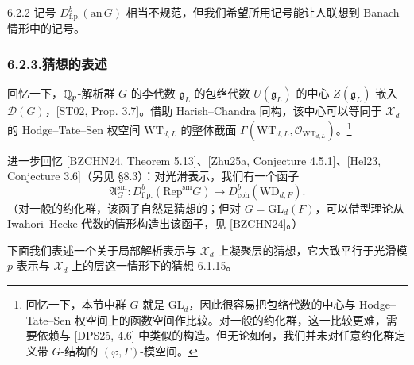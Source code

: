 \begin{rem}{6.2.2}
记号 $D^b_{\mathrm{f.p.}}(\mathrm{an}\,G)$ 相当不规范，但我们希望所用记号能让人联想到 Banach 情形中的记号。
\end{rem}

\subsubsection*{6.2.3.\quad 猜想的表述}

回忆一下，$\mathbb{Q}_p$-解析群 $G$ 的李代数 $\mathfrak g_L$ 的包络代数 $U(\mathfrak g_L)$ 的中心 $Z(\mathfrak g_L)$ 嵌入 $\mathcal D(G)$，[ST02, Prop. 3.7]。借助 Harish--Chandra 同构，该中心可以等同于 $\mathcal X_d$ 的 Hodge--Tate--Sen 权空间 $\mathrm{WT}_{d,L}$ 的整体截面 $\Gamma(\mathrm{WT}_{d,L},\mathcal O_{\mathrm{WT}_{d,L}})$。\footnote{回忆一下，本节中群 $G$ 就是 $\mathrm{GL}_d$，因此很容易把包络代数的中心与 Hodge--Tate--Sen 权空间上的函数空间作比较。对一般的约化群，这一比较更难，需要依赖与 [DPS25, 4.6] 中类似的构造。但无论如何，我们并未对任意约化群定义带 $G$-结构的 $(\varphi,\Gamma)$-模空间。}

进一步回忆 [BZCHN24, Theorem 5.13]、[Zhu25a, Conjecture 4.5.1]、[Hel23, Conjecture 3.6]（另见 §8.3）：对光滑表示，我们有一个函子
\[
\mathfrak A^{\mathrm{sm}}_G:D^b_{\mathrm{f.p.}}(\mathrm{Rep}^{\mathrm{sm}}G)\longrightarrow D^b_{\mathrm{coh}}(\mathrm{WD}_{d,F}).
\]
（对一般的约化群，该函子自然是猜想的；但对 $G=\mathrm{GL}_d(F)$，可以借型理论从 Iwahori--Hecke 代数的情形构造出该函子，见 [BZCHN24]。）

下面我们表述一个关于局部解析表示与 $\mathcal X_d$ 上凝聚层的猜想，它大致平行于光滑模 $p$ 表示与 $\mathcal X_d$ 上的层这一情形下的猜想 6.1.15。

